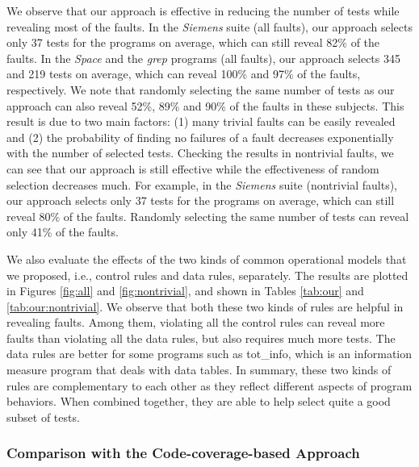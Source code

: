 \documentclass{sig-alternate}
\begin{document}
We observe that our approach is effective in reducing the number of
tests while revealing most of the faults. In the \emph{Siemens}
suite (all faults), our approach selects only 37 tests for the
programs on average, which can still reveal 82\% of the faults. In
the \emph{Space} and the \emph{grep} programs (all faults), our
approach selects 345 and 219 tests on average, which can reveal
100\% and 97\% of the faults, respectively. We note that randomly
selecting the same number of tests as our approach can also reveal
52\%, 89\% and 90\% of the faults in these subjects. This result is
due to two main factors: (1) many trivial faults can be easily
revealed and (2) the probability of finding no failures of a fault
decreases exponentially with the number of selected tests. Checking
the results in nontrivial faults, we can see that our approach is
still effective while the effectiveness of random selection
decreases much. For example, in the \emph{Siemens} suite (nontrivial
faults), our approach selects only 37 tests for the programs on
average, which can still reveal 80\% of the faults. Randomly
selecting the same number of tests can reveal only 41\% of the
faults.

\vspace{0.2in} We also evaluate the effects of the two kinds of
common operational models that we proposed, i.e., control rules and
data rules, separately. The results are plotted in Figures
\ref{fig:all} and \ref{fig:nontrivial}, and shown in Tables
\ref{tab:our} and \ref{tab:our:nontrivial}. We observe that both
these two kinds of rules are helpful in revealing faults. Among
them, violating all the control rules can reveal more faults than
violating all the data rules, but also requires much more tests. The
data rules are better for some programs such as tot\_info, which is
an information measure program that deals with data tables. In
summary, these two kinds of rules are complementary to each other as
they reflect different aspects of program behaviors. When combined
together, they are able to help select quite a good subset of tests.




\subsubsection{Comparison with the Code-coverage-based Approach}
\end{document}
